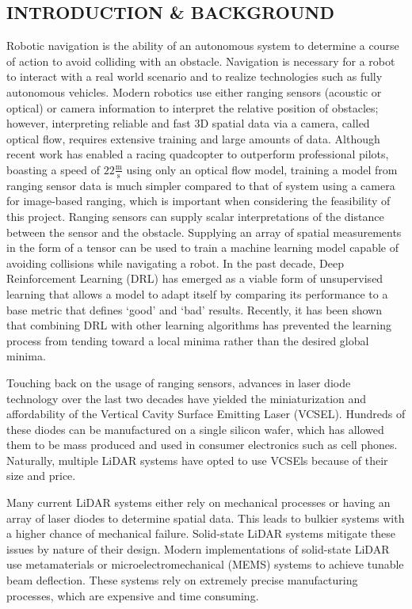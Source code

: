 \documentclass[12pt]{article}
\begin{document}
\subsection*{INTRODUCTION \& BACKGROUND}

Robotic navigation is the ability of an autonomous system to determine a course of action to avoid colliding with an obstacle.
Navigation is necessary for a robot to interact with a real world scenario and to realize technologies such as fully autonomous vehicles.
Modern robotics use either ranging sensors (acoustic or optical) or camera information to interpret the relative position of obstacles; however, interpreting reliable and fast 3D spatial data via a camera, called optical flow, requires extensive training and large amounts of data.
Although recent work has enabled a racing quadcopter to outperform professional pilots, boasting a speed of $22\frac{\text{m}}{\text{s}}$ using only an optical flow model, training a model from ranging sensor data is much simpler compared to that of system using a camera for image-based ranging, which is important when considering the feasibility of this project. \autocite{song2023}
Ranging sensors can supply scalar interpretations of the distance between the sensor and the obstacle.
Supplying an array of spatial measurements in the form of a tensor can be used to train a machine learning model capable of avoiding collisions while navigating a robot.
In the past decade, Deep Reinforcement Learning (DRL) has emerged as a viable form of unsupervised learning that allows a model to adapt itself by comparing its performance to a base metric that defines `good' and `bad' results. \autocite{zhu2021}
Recently, it has been shown that combining DRL with other learning algorithms has prevented the learning process from tending toward a local minima rather than the desired global minima. \autocite{hodge2021}

Touching back on the usage of ranging sensors, advances in laser diode technology over the last two decades have yielded the miniaturization and affordability of the Vertical Cavity Surface Emitting Laser (VCSEL).
Hundreds of these diodes can be manufactured on a single silicon wafer, which has allowed them to be mass produced and used in consumer electronics such as cell phones.
Naturally, multiple LiDAR systems have opted to use VCSEls because of their size and price. \autocite{raj2020, iga2000}

Many current LiDAR systems either rely on mechanical processes or having an array of laser diodes to determine spatial data.
This leads to bulkier systems with a higher chance of mechanical failure. Solid-state LiDAR systems mitigate these issues by nature of their design. \autocite{li2022}
Modern implementations of solid-state LiDAR use metamaterials or microelectromechanical (MEMS) systems to achieve tunable beam deflection.
These systems rely on extremely precise manufacturing processes, which are expensive and time consuming.
\end{document}
